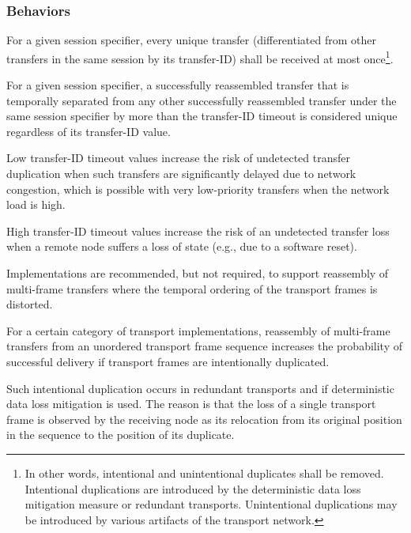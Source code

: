 \subsubsection{Behaviors}

For a given session specifier, every unique transfer
(differentiated from other transfers in the same session by its transfer-ID)
shall be received at most once\footnote{%
    In other words, intentional and unintentional duplicates shall be removed.
    Intentional duplications are introduced by the deterministic data loss mitigation measure or redundant transports.
    Unintentional duplications may be introduced by various artifacts of the transport network.
}.

For a given session specifier, a successfully reassembled transfer that is temporally separated from
any other successfully reassembled transfer under the same session specifier by more than the transfer-ID timeout
is considered unique regardless of its transfer-ID value.

\begin{remark}
    Low transfer-ID timeout values increase the risk of undetected transfer duplication when such transfers
    are significantly delayed due to network congestion,
    which is possible with very low-priority transfers when the network load is high.

    High transfer-ID timeout values increase the risk of an undetected transfer loss
    when a remote node suffers a loss of state (e.g., due to a software reset).
\end{remark}

Implementations are recommended, but not required, to support reassembly of
multi-frame transfers where the temporal ordering of the transport frames is distorted.

\begin{remark}
    For a certain category of transport implementations, reassembly of multi-frame transfers from an
    unordered transport frame sequence increases the probability of successful delivery if
    transport frames are intentionally duplicated.

    Such intentional duplication occurs in redundant transports and if deterministic data loss mitigation is used.
    The reason is that the loss of a single transport frame is observed by the receiving node as its relocation
    from its original position in the sequence to the position of its duplicate.
\end{remark}

